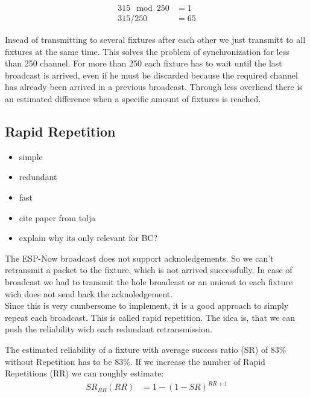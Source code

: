 \documentclass[]{ccs-thesis}
\begin{document}
\begin{align*}
	315 \mod 250 &= 1 \\
	315 / 250 &= 65
\end{align*}

Insead of transmitting to several fixtures after each other we just transmitt to all fixtures at the same time.
This solves the problem of synchronization for less than 250 channel.
For more than 250 each fixture has to wait until the last broadcast is arrived, 
even if he must be discarded because the required channel has already been arrived in a previous broadcast.
Through less overhead there is an estimated difference when a specific amount of fixtures is reached.

\subsection{Rapid Repetition}
\begin{itemize}
\item simple
\item redundant
\item fast
\item cite paper from tolja
\item explain why its only relevant for BC?
\end{itemize}

The ESP-Now broadcast does not support acknoledgements.
So we can't retransmit a packet to the fixture, which is not arrived successfully.
In case of broadcast we had to transmit the hole broadcast or an unicast to each fixture wich does not send back the acknoledgement.\\

Since this is very cumbersome to implement, it is a good approach to simply repeat each broadcast. 
This is called rapid repetition. 
The idea is, that we can push the reliability wich each redundant retransmission.

The estimated reliability of a fixture with average success ratio (SR) of 83\% without Repetition has to be 83\%.
If we increase the number of Rapid Repetitions (RR) we can roughly estimate:
\begin{align}
	SR_{RR}(RR) &= 1-(1-SR)^{RR+1} 
\end{align}
\end{document}
